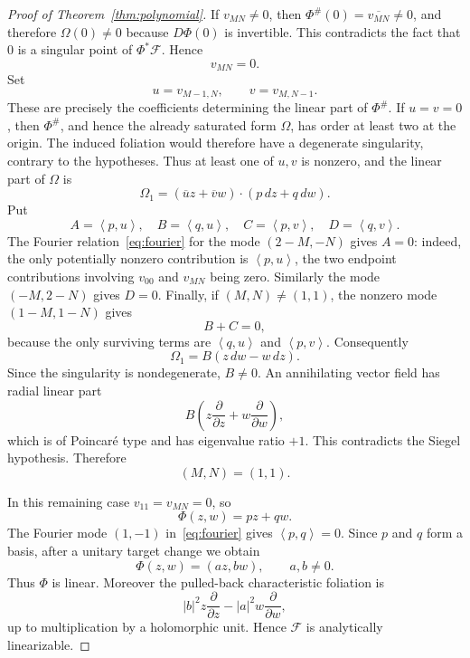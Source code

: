 \documentclass[11pt,reqno]{article}
\theoremstyle{remark}
\newcommand{\F}{\mathcal F}
\newcommand{\pd}{\partial}
\newcommand{\ol}{\overline}
\newcommand{\ip}[2]{\left\langle #1,#2\right\rangle}
\begin{document}
\begin{proof}[Proof of Theorem~\ref{thm:polynomial}]
If $v_{MN}\neq0$, then $\Phi^{\#}(0)=\ol{v_{MN}}\neq0$, and therefore $\Omega(0)\neq0$ because $D\Phi(0)$ is invertible. This contradicts the fact that $0$ is a singular point of $\Phi^*\F$. Hence
\[
 v_{MN}=0.
\]
Set
\[
 u=v_{M-1,N},\qquad v=v_{M,N-1}.
\]
These are precisely the coefficients determining the linear part of $\Phi^{\#}$. If $u=v=0$, then $\Phi^{\#}$, and hence the already saturated form $\Omega$, has order at least two at the origin. The induced foliation would therefore have a degenerate singularity, contrary to the hypotheses. Thus at least one of $u,v$ is nonzero, and the linear part of $\Omega$ is
\[
 \Omega_1=(\ol u z+\ol v w)\cdot(p\,dz+q\,dw).
\]
Put
\[
 A=\ip{p}{u},\quad B=\ip{q}{u},\quad
 C=\ip{p}{v},\quad D=\ip{q}{v}.
\]
The Fourier relation~\eqref{eq:fourier} for the mode $(2-M,-N)$ gives $A=0$: indeed, the only potentially nonzero contribution is $\ip{p}{u}$, the two endpoint contributions involving $v_{00}$ and $v_{MN}$ being zero. Similarly the mode $(-M,2-N)$ gives $D=0$. Finally, if $(M,N)\neq(1,1)$, the nonzero mode $(1-M,1-N)$ gives
\[
 B+C=0,
\]
because the only surviving terms are $\ip{q}{u}$ and $\ip{p}{v}$. Consequently
\[
 \Omega_1=B(z\,dw-w\,dz).
\]
Since the singularity is nondegenerate, $B\neq0$. An annihilating vector field has radial linear part
\[
 B\left(z\frac{\pd}{\pd z}+w\frac{\pd}{\pd w}\right),
\]
which is of Poincar\'e type and has eigenvalue ratio $+1$. This contradicts the Siegel hypothesis. Therefore
\[
 (M,N)=(1,1).
\]

In this remaining case $v_{11}=v_{MN}=0$, so
\[
 \Phi(z,w)=pz+qw.
\]
The Fourier mode $(1,-1)$ in~\eqref{eq:fourier} gives $\ip{p}{q}=0$. Since $p$ and $q$ form a basis, after a unitary target change we obtain
\[
 \Phi(z,w)=(az,bw),\qquad a,b\neq0.
\]
Thus $\Phi$ is linear. Moreover the pulled-back characteristic foliation is
\[
 |b|^2z\frac{\pd}{\pd z}-|a|^2w\frac{\pd}{\pd w},
\]
up to multiplication by a holomorphic unit. Hence $\F$ is analytically linearizable.
\end{proof}
\end{document}
